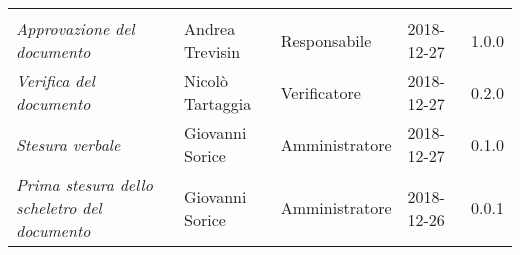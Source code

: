 \newpage 
\section*{}
\begin{table}[H]
	\centering
	\begin{tabular}{p{4cm}|C{3cm}|C{3cm}|R{2.5cm}|R{2cm}}
		
		 & & & & \\
		
		
		\emph{Approvazione del documento} &  Andrea Trevisin & Responsabile & 2018-12-27 & 1.0.0 \\
		\hline
		
		\emph{Verifica del documento} & Nicolò Tartaggia & Verificatore & 2018-12-27 & 0.2.0 \\
		\hline

		\emph{Stesura verbale} & Giovanni Sorice & Amministratore & 2018-12-27 & 0.1.0 \\
		\hline
		
		\emph{Prima stesura dello scheletro del documento} & Giovanni Sorice & Amministratore & 2018-12-26 & 0.0.1 \\
		
	\end{tabular}
	
\end{table}


\clearpage